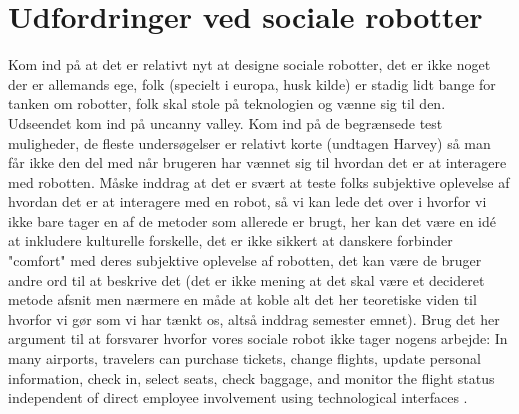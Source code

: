 \section{Udfordringer ved sociale robotter}
\label{UdfordringerSocialeRobotter}
%
Kom ind på at det er relativt nyt at designe sociale robotter, det er ikke noget der er allemands ege, folk (specielt i europa, husk kilde) er stadig lidt bange for tanken om robotter, folk skal stole på teknologien og vænne sig til den. Udseendet kom ind på uncanny valley. Kom ind på de begrænsede test muligheder, de fleste undersøgelser er relativt korte (undtagen Harvey) så man får ikke den del med når brugeren har vænnet sig til hvordan det er at interagere med robotten.  \blankline
%
Måske inddrag at det er svært at teste folks subjektive oplevelse af hvordan det er at interagere med en robot, så vi kan lede det over i hvorfor vi ikke bare tager en af de metoder som allerede er brugt, her kan det være en idé at inkludere kulturelle forskelle, det er ikke sikkert at danskere forbinder "comfort" med deres subjektive oplevelse af robotten, det kan være de bruger andre ord til at beskrive det (det er ikke mening at det skal være et decideret metode afsnit men nærmere en måde at koble alt det her teoretiske viden til hvorfor vi gør som vi har tænkt os, altså inddrag semester emnet).\blankline
%
Brug det her argument til at forsvarer hvorfor vores sociale robot ikke tager nogens arbejde: In many airports, travelers can purchase tickets, change flights, update personal information, check in, select seats, check baggage, and monitor the flight status independent of direct employee involvement using technological interfaces \textcite[s. 352]{PDF:TheImpactOfTraveler}.

